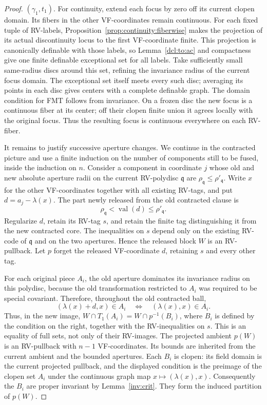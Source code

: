 \documentclass[12pt]{amsart}
\theoremstyle{plain}
\theoremstyle{definition}
\theoremstyle{remark}
\numberwithin{equation}{section}
\theoremstyle{plain}
\newcommand{\gq}{\mathfrak{q}}
\newcommand{\0}{\emptyset}
\DeclareMathOperator{\vv}{val}
\begin{document}
\begin{proof}
$(\gamma_{1}, t_{1})$. For continuity, extend each focus by zero off its current clopen domain. Its fibers in the other VF-coordinates remain continuous. For each fixed tuple of RV-labels, Proposition~\ref{prop:continuity:fiberwise} makes the projection of its actual discontinuity locus to the first VF-coordinate finite. This projection is canonically definable with those labels, so Lemma~\ref{dcl:to:ac} and compactness give one finite definable exceptional set for all labels. Take sufficiently small same-radius discs around this set, refining the invariance radius of the current focus domain. The exceptional set itself meets every such disc; averaging its points in each disc gives centers with a complete definable graph. The domain condition for FMT follows from invariance. On a frozen disc the new focus is a continuous fiber at its center; off their clopen finite union it agrees locally with the original focus. Thus the resulting focus is continuous everywhere on each RV-fiber.


It remains to justify successive aperture changes. We continue in the contracted picture and use a finite induction on the number of components still to be fused, inside the induction on $n$. Consider a component in coordinate $j$ whose old and new absolute aperture radii on the current RV-polydisc $\gq$ are $\rho_\gq\leq\rho'_\gq$. Write $x$ for the other VF-coordinates together with all existing RV-tags, and put $d=a_j-\lambda(x)$. The part newly released from the old contracted clause is
\[
\rho_\gq<\vv(d)\leq\rho'_\gq.
\]
Regularize $d$, retain its RV-tag $s$, and retain the finite tag distinguishing it from the new contracted core. The inequalities on $s$ depend only on the existing RV-code of $\gq$ and on the two apertures. Hence the released block $W$ is an RV-pullback. Let $p$ forget the released VF-coordinate $d$, retaining $s$ and every other tag.

For each original piece $A_i$, the old aperture dominates its invariance radius on this polydisc, because the old transformation restricted to $A_i$ was required to be special covariant. Therefore, throughout the old contracted ball,
\[
(\lambda(x)+d,x)\in A_i
\quad\Longleftrightarrow\quad
(\lambda(x),x)\in A_i.
\]
Thus, in the new image, $W\cap T_1(A_i)=W\cap p^{-1}(B_i)$, where $B_i$ is defined by the condition on the right, together with the RV-inequalities on $s$. This is an equality of full sets, not only of their RV-images. The projected ambient $p(W)$ is an RV-pullback with $n-1$ VF-coordinates. Its bounds are inherited from the current ambient and the bounded apertures. Each $B_i$ is clopen: its field domain is the current projected pullback, and the displayed condition is the preimage of the clopen set $A_i$ under the continuous graph map $x\mapsto(\lambda(x),x)$. Consequently the $B_i$ are proper invariant by Lemma~\ref{inv:crit}. They form the induced partition of $p(W)$.


\end{proof}
\end{document}
